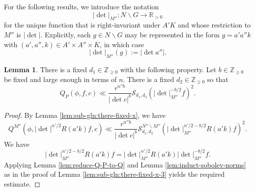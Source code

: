 \documentclass[reqno]{amsart}
\theoremstyle{plain} \newtheorem{theorem} {Theorem}
\theoremstyle{definition} \newtheorem{definition} [theorem] {Definition}
\theoremstyle{itplain} %
\newtheorem{lemma}[theorem]{Lemma}
\numberwithin{equation}{section}
\numberwithin{theorem}{section}
\renewcommand{\geq}{\geqslant}
\begin{document}
For the following results, we introduce the notation
\begin{equation*}
  |\det|_{M''} : N \backslash G \rightarrow \mathbb{R}_{>0}
\end{equation*}
for the unique function that is right-invariant under $A' K$ and whose restriction to $M''$ is $|\det|$.  Explicitly, each $g \in N \backslash G$ may be represented in the form $g = a' a'' k$ with $(a',a'',k) \in A' \times A'' \times K$, in which case
\begin{equation*}
  |\det|_{M''}(g) := |\det a''|.
\end{equation*}

\begin{lemma}\label{lem:sub-gln:there-fixed-x-1}
  There is a fixed $d_1 \in \mathbb{Z}_{\geq 0}$ with the following property.  Let $b \in \mathbb{Z}_{\geq 0}$ be fixed and large enough in terms of $n$.  There is a fixed $d_2 \in \mathbb{Z}_{\geq 0}$ so that
  \begin{equation*}
    Q_P(\phi,f,c)
    \ll
    \frac{r^{n'' b}}{|\det c|^b}
    \mathcal{S}_{d_1, d_2}\left(|\det|_{M''}^{-b/2} f\right)^2.
  \end{equation*}
\end{lemma}
\begin{proof}
  By Lemma \ref{lem:sub-gln:there-fixed-x}, we have
  \begin{equation*}
    Q^{M''}\left(\phi, |\det|^{n'/2} R(a' k) f, c\right)
    \ll
    \frac{r^{n'' b}}{|\det c|^b}
    \mathcal{S}_{d_1, d_2}^{N'' \backslash M''}\left(|\det|_{M''}^{n'/2 - b/2} R(a' k) f\right)^2.
  \end{equation*}
  We have
  \begin{equation*}
    |\det|_{M''}^{n'/2 - b/2} R(a' k) f
    =
    |\det|_{M''}^{n'/2} R(a' k)
    |\det|_{M''}^{- b/2}
    f.
  \end{equation*}
  Applying Lemma \ref{lem:reduce-Q-P-to-Q} and Lemma \ref{lem:induct-sobolev-norms} as in the proof of Lemma \ref{lem:sub-gln:there-fixed-x-3} yields the required estimate.
\end{proof}
\end{document}
